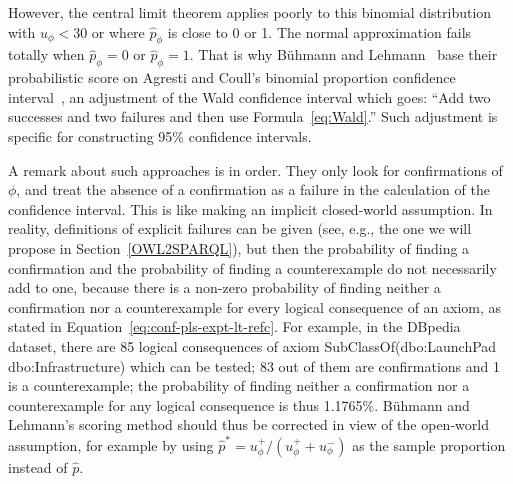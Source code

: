 \documentclass{llncs}
\begin{document}
However, the central limit theorem applies poorly to this binomial distribution
with $u_\phi<30$ or where $\hat{p}_\phi$ is close to 0 or 1.
The normal approximation fails totally when $\hat{p}_\phi = 0$ or $\hat{p}_\phi = 1$.
That is why B\"uhmann and Lehmann~\cite{BuehmannLehmann2012} base their probabilistic score
on Agresti and Coull's binomial proportion confidence interval~\cite{AgrestiCoull1998},
an adjustment of the Wald confidence interval which goes: ``Add two successes and two failures
and then use Formula~\ref{eq:Wald}.'' Such adjustment is specific for constructing
95\% confidence intervals.


A remark about such approaches is in order. They only look for confirmations of $\phi$, and treat
the absence of a confirmation as a failure in the calculation of the confidence interval.
This is like making an implicit closed-world assumption. In reality, definitions
of explicit failures can be given (see, e.g.,
the one we will propose in Section~\ref{OWL2SPARQL}), but then the probability
of finding a confirmation and the probability of finding a counterexample do not necessarily add to one,
because there is a non-zero probability of finding neither a confirmation nor a counterexample
for every logical consequence of an axiom, as stated in Equation~\ref{eq:conf-pls-expt-lt-refc}.
For example, in the DBpedia dataset, there are 85 logical consequences of axiom
\textsf{SubClassOf}(\textsf{dbo:LaunchPad} \textsf{dbo:Infrastructure}) which can be tested;
83 out of them are confirmations and 1 is a counterexample; the probability of finding neither a
confirmation nor a counterexample for any logical consequence is thus 1.1765\%.
B\"uhmann and Lehmann's scoring method should thus be
corrected in view of the open-world assumption, for example by using
$\hat{p}^* = u_\phi^+/(u_\phi^+ + u_\phi^-)$ as the sample proportion instead of $\hat{p}$.
\end{document}
